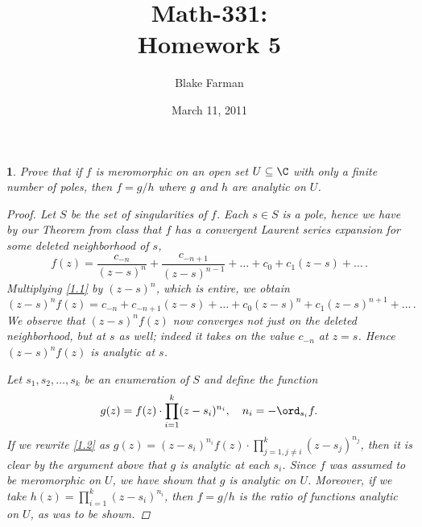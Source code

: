 \documentclass[10pt]{amsart}
\author{Blake Farman}
\title{Math-331:\\Homework 5}
\date{March 11, 2011}\pdfpagewidth 8.5in
\begin{document}
\maketitle

\newtheorem{thm}{}

\begin{thm}
  \label{Ex1}
  Prove that if $f$ is meromorphic on an open set $U \subseteq \C$ with only a finite number of poles, then $f = g/h$ where $g$ and $h$ are analytic on $U$. 
\begin{proof}
  Let $S$ be the set of singularities of $f$.  
  Each $s \in S$ is a pole, hence we have by our Theorem from class that $f$ has a convergent Laurent series expansion for some deleted neighborhood of $s$,
  \begin{equation}
    \label{1.1}
    f(z) = \frac{c_{-n}}{(z-s)^n} + \frac{c_{-n+1}}{(z-s)^{n-1}} + \ldots + c_0 + c_1(z-s) + \ldots\,.
  \end{equation}
  Multiplying \eqref{1.1} by $(z-s)^n$, which is entire, we obtain
  $$(z-s)^nf(z) = c_{-n} + c_{-n+1}(z-s) + \ldots + c_0(z-s)^n + c_1(z-s)^{n+1} + \ldots\,.$$
  We observe that $(z-s)^nf(z)$ now converges not just on the deleted neighborhood, but at $s$ as well; indeed it takes on the value $c_{-n}$ at $z = s$.
  Hence $(z-s)^nf(z)$ is analytic at $s$.
  
  Let $s_1, s_2, \ldots, s_k$ be an enumeration of $S$ and define the function 
  \begin{equation}
    \label{1.2}
    g(z) = f(z)\cdot\prod_{i=1}^k(z-s_i)^{n_i}, \quad  n_i = -\ord_{s_i}{f}.
  \end{equation}
  If we rewrite \eqref{1.2} as $g(z) = (z-s_i)^{n_i}f(z){\cdot}\prod_{j=1,j \not = i}^k(z-s_j)^{n_j}$, then it is clear by the argument above that $g$ is analytic at each $s_i$.
  Since $f$ was assumed to be meromorphic on $U$, we have shown that $g$ is analytic on $U$.
  Moreover, if we take $h(z) = \prod_{i=1}^k(z-s_i)^{n_i}$, then $f = g/h$ is the ratio of functions analytic on $U$, as was to be shown.
\end{proof}
\end{thm}
\end{document}
